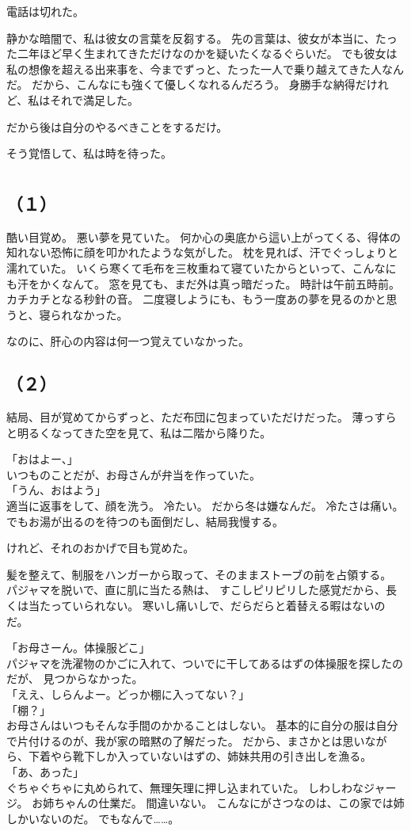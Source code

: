 \documentclass[../IHMain]{subfiles}
\begin{document}
電話は切れた。

静かな暗闇で、私は彼女の言葉を反芻する。
先の言葉は、彼女が本当に、たった二年ほど早く生まれてきただけなのかを疑いたくなるぐらいだ。
でも彼女は私の想像を超える出来事を、今までずっと、たった一人で乗り越えてきた人なんだ。
だから、こんなにも強くて優しくなれるんだろう。
身勝手な納得だけれど、私はそれで満足した。

だから後は自分のやるべきことをするだけ。

そう覚悟して、私は時を待った。

\section{}
\subsection*{\gt \centering（１）}
酷い目覚め。
悪い夢を見ていた。
何か心の奥底から這い上がってくる、得体の知れない恐怖に顔を叩かれたような気がした。
枕を見れば、汗でぐっしょりと濡れていた。
いくら寒くて毛布を三枚重ねて寝ていたからといって、こんなにも汗をかくなんて。
窓を見ても、まだ外は真っ暗だった。
時計は午前五時前。
カチカチとなる秒針の音。
二度寝しようにも、もう一度あの夢を見るのかと思うと、寝られなかった。

なのに、肝心の内容は何一つ覚えていなかった。

\subsection*{\gt（２）}
結局、目が覚めてからずっと、ただ布団に包まっていただけだった。
薄っすらと明るくなってきた空を見て、私は二階から降りた。

「おはよー、」\\
いつものことだが、お母さんが弁当を作っていた。\\
「うん、おはよう」\\
適当に返事をして、顔を洗う。
冷たい。
だから冬は嫌なんだ。
冷たさは痛い。
でもお湯が出るのを待つのも面倒だし、結局我慢する。

けれど、それのおかげで目も覚めた。

髪を整えて、制服をハンガーから取って、そのままストーブの前を占領する。
パジャマを脱いで、直に肌に当たる熱は、
すこしピリピリした感覚だから、長くは当たっていられない。
寒いし痛いしで、だらだらと着替える暇はないのだ。

「お母さーん。体操服どこ」\\
パジャマを洗濯物のかごに入れて、ついでに干してあるはずの体操服を探したのだが、
見つからなかった。\\
「ええ、しらんよー。どっか棚に入ってない？」\\
「棚？」\\
お母さんはいつもそんな手間のかかることはしない。
基本的に自分の服は自分で片付けるのが、我が家の暗黙の了解だった。
だから、まさかとは思いながら、下着やら靴下しか入っていないはずの、姉妹共用の引き出しを漁る。\\
「あ、あった」\\
ぐちゃぐちゃに丸められて、無理矢理に押し込まれていた。
しわしわなジャージ。
お姉ちゃんの仕業だ。
間違いない。
こんなにがさつなのは、この家では姉しかいないのだ。
でもなんで……。
\end{document}
